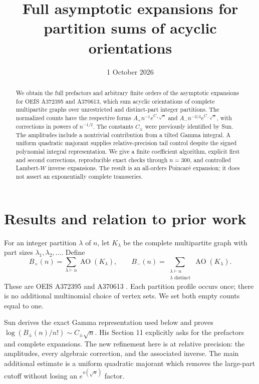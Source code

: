 \documentclass[11pt]{article}
\title{Full asymptotic expansions for partition sums of acyclic orientations}
\author{}
\date{1 October 2026}
\theoremstyle{remark}\newtheorem{remark}[theorem]{Remark}
\newcommand{\AO}{\operatorname{AO}}
\begin{document}
\maketitle
\begin{abstract}
We obtain the full prefactors and arbitrary finite orders of the asymptotic
expansions for OEIS A372395 and A370613, which sum acyclic orientations of
complete multipartite graphs over unrestricted and distinct-part integer
partitions. The normalized counts have the respective forms
$A_+n^{-1}e^{C_+\sqrt n}$ and $A_-n^{-3/4}e^{C_-\sqrt n}$, with corrections
in powers of $n^{-1/2}$. The constants $C_\pm$ were previously identified
by Sun. The amplitudes include a nontrivial contribution from a tilted
Gamma integral. A uniform quadratic majorant supplies relative-precision
tail control despite the signed polynomial integral representation.
We give a finite coefficient algorithm, explicit first and second
corrections, reproducible exact checks through $n=300$, and controlled
Lambert-$W$ inverse expansions. The result is an all-orders Poincar\'e
expansion; it does not assert an exponentially complete transseries.
\end{abstract}

\section{Results and relation to prior work}\label{aop:sec:results}

For an integer partition $\lambda$ of $n$, let $K_\lambda$ be the complete
multipartite graph with part sizes $\lambda_1,\lambda_2,\ldots$. Define
\[
 B_+(n)=\sum_{\lambda\vdash n}\AO(K_\lambda),\qquad
 B_-(n)=\sum_{\substack{\lambda\vdash n\\\lambda\text{ distinct}}}\AO(K_\lambda).
\]
These are OEIS A372395 and A370613 \cite{oeisb,oeisf}. Each partition
profile occurs once; there is no additional multinomial choice of vertex
sets. We set both empty counts equal to one.

Sun \cite{sun} derives the exact Gamma representation used below and proves
$\log(B_\pm(n)/n!)\sim C_\pm\sqrt n$. His Section 11 explicitly asks for
the prefactors and complete expansions. The new refinement here is at
relative precision: the amplitudes, every algebraic correction, and the
associated inverse. The main additional estimate is a uniform quadratic
majorant which removes the large-part cutoff without losing an
$e^{o(\sqrt n)}$ factor.
\end{document}

